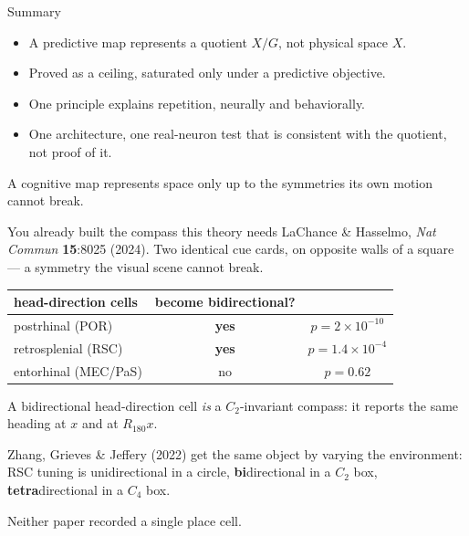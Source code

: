 \documentclass[9pt,aspectratio=169]{beamer}
\begin{document}
\begin{frame}{Summary}
\vspace{12pt}
\begin{itemize}
\item A predictive map represents a quotient $X/G$, not physical space $X$.
\vspace{6pt}
\item Proved as a ceiling, saturated only under a predictive objective.
\vspace{6pt}
\item One principle explains repetition, neurally and behaviorally.
\vspace{6pt}
\item One architecture, one real-neuron test that is consistent with the quotient, not proof
of it.
\end{itemize}

\vspace{20pt}
\centering
\large A cognitive map represents space only up to the symmetries its own motion cannot break.
\end{frame}

\appendix

\begin{frame}{You already built the compass this theory needs}
\vspace{6pt}
LaChance \& Hasselmo, \textit{Nat Commun} \textbf{15}:8025 (2024). Two identical cue cards, on
opposite walls of a square --- a symmetry the visual scene cannot break.

\vspace{10pt}
\centering
\begin{tabular}{lcc}
\toprule
head-direction cells & become bidirectional? & \\
\midrule
postrhinal (POR)     & \textbf{yes} & $p = 2\times10^{-10}$ \\
retrosplenial (RSC)  & \textbf{yes} & $p = 1.4\times10^{-4}$ \\
entorhinal (MEC/PaS) & no           & $p = 0.62$ \\
\bottomrule
\end{tabular}

\vspace{14pt}
\raggedright
A bidirectional head-direction cell \emph{is} a $C_2$-invariant compass: it reports the same heading
at $x$ and at $R_{180}x$.

\vspace{6pt}
Zhang, Grieves \& Jeffery (2022) get the same object by varying the environment: RSC tuning is
unidirectional in a circle, \textbf{bi}directional in a $C_2$ box, \textbf{tetra}directional in a
$C_4$ box.

\vspace{10pt}
\centering
\alert{Neither paper recorded a single place cell.}
\end{frame}
\end{document}
